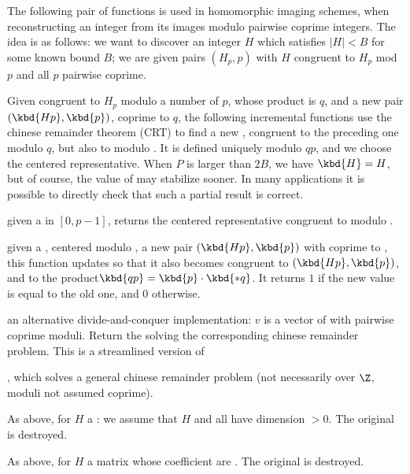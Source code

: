 \medskip

The following pair of functions is used in homomorphic imaging schemes,
when reconstructing an integer from its images modulo pairwise coprime
integers. The idea is as follows: we want to discover an integer $H$ which
satisfies $|H| < B$ for some known bound $B$; we are given pairs $(H_p, p)$
with $H$ congruent to $H_p$ mod $p$ and all $p$ pairwise coprime.

Given  congruent to $H_p$ modulo a number of $p$, whose product is
$q$, and a new pair $(\kbd{Hp}, \kbd{p})$,  coprime to $q$, the
following incremental functions use the chinese remainder theorem (CRT) to
find a new , congruent to the preceding one modulo $q$, but also to
 modulo . It is defined uniquely modulo $qp$, and we choose
the centered representative. When $P$ is larger than $2B$, we have $\kbd{H} =
H$, but of course, the value of  may stabilize sooner. In many
applications it is possible to directly check that such a partial result is
correct.

 given a   in
$[0, p-1]$, returns the centered representative  congruent to 
modulo .

given a  , centered modulo , a new pair $(\kbd{Hp},
\kbd{p})$ with  coprime to , this function updates  so
that it also becomes congruent to $(\kbd{Hp}, \kbd{p})$, and  to the
product$\kbd{qp} = \kbd{p} \cdot \kbd{*q}$. It returns $1$ if the new value
is equal to the old one, and $0$ otherwise.

 an alternative divide-and-conquer
implementation: $v$ is a vector of  with pairwise coprime moduli.
Return the  solving the corresponding chinese remainder problem.
This is a streamlined version of

, which solves a general chinese remainder problem
(not necessarily over $\Z$, moduli not assumed coprime).

As above, for $H$ a : we assume that $H$ and all  have
dimension $> 0$. The original  is destroyed.



As above, for $H$ a matrix whose coefficient are .
The original  is destroyed.

